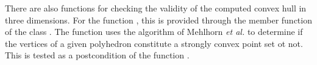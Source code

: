 There are also functions for checking the validity of the computed convex
hull in three dimensions.  For the function , this is 
provided through the  member function of the class 
.
The function 
uses the algorithm of Mehlhorn \textit{et al.} \cite{mnssssu-cgpvg-96}
to determine if the vertices of a given polyhedron constitute a strongly
convex point set ot not.  This is tested as a postcondition of the function
.  
